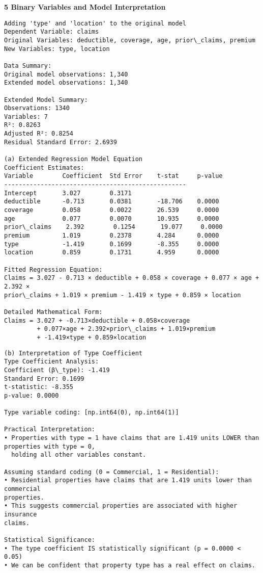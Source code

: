 \documentclass[8pt, twocolumn]{extarticle}
\begin{document}
    \textbf{5 Binary Variables and Model Interpretation}
    \begin{Verbatim}[commandchars=\\\{\}]
Adding 'type' and 'location' to the original model
Dependent Variable: claims
Original Variables: deductible, coverage, age, prior\_claims, premium
New Variables: type, location

Data Summary:
Original model observations: 1,340
Extended model observations: 1,340

Extended Model Summary:
Observations: 1340
Variables: 7
R²: 0.8263
Adjusted R²: 0.8254
Residual Standard Error: 2.6939

(a) Extended Regression Model Equation
Coefficient Estimates:
Variable        Coefficient  Std Error    t-stat     p-value
--------------------------------------------------
Intercept       3.027        0.3171
deductible      -0.713       0.0381       -18.706    0.0000
coverage        0.058        0.0022       26.539     0.0000
age             0.077        0.0070       10.935     0.0000
prior\_claims    2.392        0.1254       19.077     0.0000
premium         1.019        0.2378       4.284      0.0000
type            -1.419       0.1699       -8.355     0.0000
location        0.859        0.1731       4.959      0.0000

Fitted Regression Equation:
Claims = 3.027 - 0.713 × deductible + 0.058 × coverage + 0.077 × age + 2.392 ×
prior\_claims + 1.019 × premium - 1.419 × type + 0.859 × location

Detailed Mathematical Form:
Claims = 3.027 + -0.713×deductible + 0.058×coverage
         + 0.077×age + 2.392×prior\_claims + 1.019×premium
         + -1.419×type + 0.859×location
    \end{Verbatim}
    \begin{Verbatim}[commandchars=\\\{\}]
(b) Interpretation of Type Coefficient
Type Coefficient Analysis:
Coefficient (β\_type): -1.419
Standard Error: 0.1699
t-statistic: -8.355
p-value: 0.0000

Type variable coding: [np.int64(0), np.int64(1)]

Practical Interpretation:
• Properties with type = 1 have claims that are 1.419 units LOWER than
properties with type = 0,
  holding all other variables constant.

Assuming standard coding (0 = Commercial, 1 = Residential):
• Residential properties have claims that are 1.419 units lower than commercial
properties.
• This suggests commercial properties are associated with higher insurance
claims.

Statistical Significance:
• The type coefficient IS statistically significant (p = 0.0000 < 0.05)
• We can be confident that property type has a real effect on claims.
    \end{Verbatim}
\end{document}
